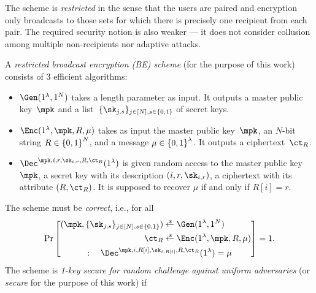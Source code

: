 The scheme is \emph{restricted} in the sense that the users are paired and encryption only broadcasts to those sets for which there is precisely one recipient from each pair.
The required security notion is also weaker --- it does not consider collusion among multiple non-recipients nor adaptive attacks.

\begin{definition}
A \emph{restricted broadcast encryption (BE) scheme} (for the purpose of this work) consists of 3 efficient algorithms:
\begin{itemize}
\item $\Gen(1^\lambda,1^N)$ takes a length parameter as input.
It outputs a master public key~$\mpk$ and
a list~$\{\sk_{j,s}\}_{j\in[N],s\in\bit}$ of secret keys.
\item $\Enc(1^\lambda,\mpk,R,\mu)$ takes as input
the master public key~$\mpk$,
an $N$-bit string ${R\in{\{0,1\}}^N}$, and
a message ${\mu\in{\{0,1\}}^\lambda}$.
It outputs a ciphertext~$\ct_R$.
\item $\Dec^{\mpk,i,r,\sk_{i,r},R,\ct_R}(1^\lambda)$
is given random access to
the master public key~$\mpk$,
a secret key with its description $(i,r,\sk_{i,r})$,
a ciphertext with its attribute $(R,\ct_R)$.
It is supposed to recover $\mu$ if and only if ${R[i]=r}$.
\end{itemize}
The scheme must be \emph{correct}, i.e., for all
%
\begin{align*}
\Pr\left[\begin{aligned}
(\mpk,\{\sk_{j,s}\}_{j\in[N],s\in\bit})
&{}
\draws\Gen(1^\lambda,1^N)
\\
\ct_R
&{}
\draws\Enc(1^\lambda,\mpk,R,\mu)
\\
:\quad
\Dec^{\mpk,i,R[i],\sk_{i,R[i]},R,\ct_R}
(1^\lambda)=\mu
\hspace*{-8em}
&
\end{aligned}
\right]
=1.
\end{align*}
The scheme is \emph{1-key secure for random challenge against uniform adversaries} (or \emph{secure} for the purpose of this work) if

\end{definition}
